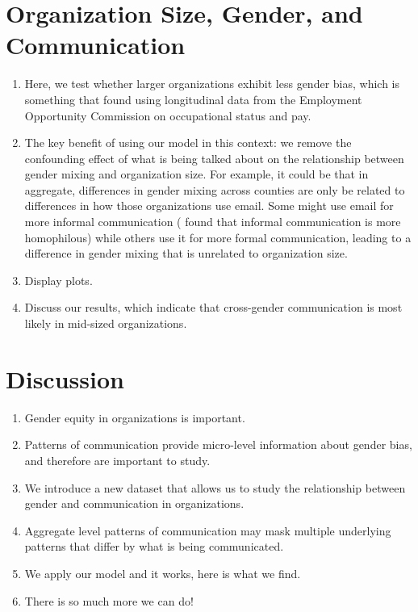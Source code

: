 \documentclass[fleqn]{MJDArticle}
\begin{document}
\section{Organization Size, Gender, and Communication}
\begin{enumerate}
	\item Here, we test whether larger organizations exhibit less gender bias, which is something that \cite{Huffman2010} found using longitudinal data from the Employment Opportunity Commission on occupational status and pay. 
	\item The key benefit of using our model in this context: we remove the confounding effect of what is being talked about on the relationship between gender mixing and organization size. For example, it could be that in aggregate, differences in gender mixing across counties are only be related to differences in how those organizations use email. Some might use email for more informal communication (\citep{Ibarra1992} found that informal communication is more homophilous) while others use it for more formal communication, leading to a difference in gender mixing that is unrelated to organization size.
	\item Display plots.
	\item Discuss our results, which indicate that cross-gender communication is most likely in mid-sized organizations. 
\end{enumerate}

\section{Discussion}
\begin{enumerate}
	\item Gender equity in organizations is important.
	\item Patterns of communication provide micro-level information about gender bias, and therefore are important to study.
	\item We introduce a new dataset that allows us to study the relationship between gender and communication in organizations.
	\item Aggregate level patterns of communication may mask multiple underlying patterns that differ by what is being communicated.
	\item We apply our model and it works, here is what we find.
	\item There is so much more we can do!
\end{enumerate}
\end{document}

